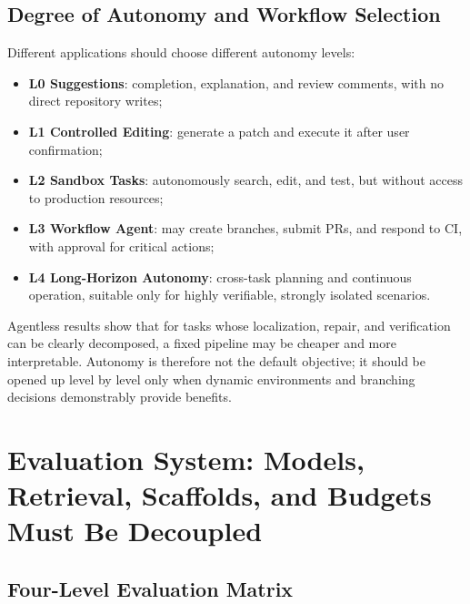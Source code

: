 \documentclass[10pt,a4paper,UTF8,fontset=none]{ctexart}
\begin{document}
\subsection{Degree of Autonomy and Workflow Selection}

Different applications should choose different autonomy levels:

\begin{itemize}
  \item \textbf{L0 Suggestions}: completion, explanation, and review comments, with no direct repository writes;
  \item \textbf{L1 Controlled Editing}: generate a patch and execute it after user confirmation;
  \item \textbf{L2 Sandbox Tasks}: autonomously search, edit, and test, but without access to production resources;
  \item \textbf{L3 Workflow Agent}: may create branches, submit PRs, and respond to CI, with approval for critical actions;
  \item \textbf{L4 Long-Horizon Autonomy}: cross-task planning and continuous operation, suitable only for highly verifiable, strongly isolated scenarios.
\end{itemize}

Agentless results show that for tasks whose localization, repair, and verification can be clearly decomposed, a fixed pipeline may be cheaper and more interpretable\cite{en:xia2024agentless}. Autonomy is therefore not the default objective; it should be opened up level by level only when dynamic environments and branching decisions demonstrably provide benefits.

\section{Evaluation System: Models, Retrieval, Scaffolds, and Budgets Must Be Decoupled}

\subsection{Four-Level Evaluation Matrix}
\end{document}
